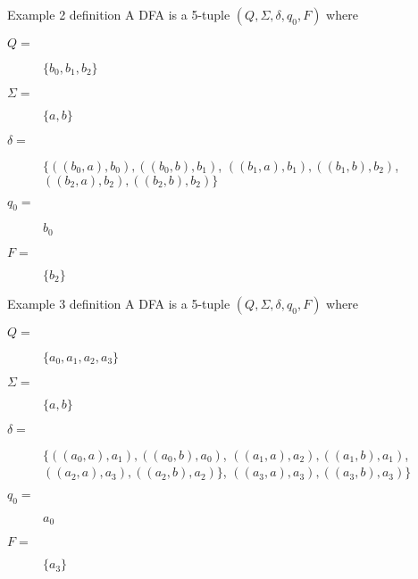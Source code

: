 \begin{frame}[fragile]{Example 2 definition}
  A DFA is a 5-tuple $(Q,\Sigma,\delta,q_0,F)$ where
  \begin{description}
    \item[$Q =$] $\{ b_0, b_1, b_2\}$
    \item[$\Sigma =$] $\{ a, b \}$
    \item[$\delta =$] $\{ ((b_0,a),b_0), ((b_0,b),b_1)$, $((b_1,a),b_1), ((b_1,b),b_2)$, $((b_2,a),b_2), ((b_2,b),b_2) \}$
    \item[$q_0 =$] $b_0$
    \item[$F =$] $\{ b_2 \}$
  \end{description}
\end{frame}

\begin{frame}[fragile]{Example 3 definition}
  A DFA is a 5-tuple $(Q,\Sigma,\delta,q_0,F)$ where
  \begin{description}
    \item[$Q =$] $\{ a_0, a_1, a_2, a_3 \}$
    \item[$\Sigma =$] $\{ a, b \}$
    \item[$\delta =$] $\{ ((a_0,a),a_1), ((a_0,b),a_0)$, $((a_1,a),a_2), ((a_1,b),a_1)$, $((a_2,a),a_3), ((a_2,b),a_2) \}$, $((a_3,a),a_3), ((a_3,b),a_3) \}$
    \item[$q_0 =$] $a_0$
    \item[$F =$] $\{ a_3 \}$
  \end{description}
\end{frame}